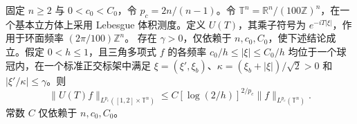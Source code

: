 固定 \(n\ge2\) 与 \(0<c_0<C_0\)，令 \(p_c=2n/(n-1)\)。令 \(\mathbb T^n=\mathbb R^n/(100\mathbb Z)^n\)，在一个基本立方体上采用 Lebesgue 体积测度。定义 \(U(T)\)，其乘子符号为 \(e^{-iT|\xi|}\)，作用于环面频率 \((2\pi/100)\mathbb Z^n\)。
存在 \(\gamma>0\)，仅依赖于 \(n,c_0,C_0\)，使下述结论成立。假定 \(0<h\le1\)，且三角多项式 \(f\) 的各频率 \(c_0/h\le|\xi|\le C_0/h\) 均位于一个球冠内，在一个标准正交标架中满足 \(\xi=(\xi',\xi_b)\)、\(\kappa=(\xi_b+|\xi|)/\sqrt 2>0\) 和 \(|\xi'/\kappa|\le\gamma\)。则
\[
 \|U(T)f\|_{L^{p_c}([1,2]\times\mathbb T^n)}
 \le C[\log(2/h)]^{2/p_c}\|f\|_{L^{p_c}(\mathbb T^n)}.
\]
常数 \(C\) 仅依赖于 \(n,c_0,C_0\)。
